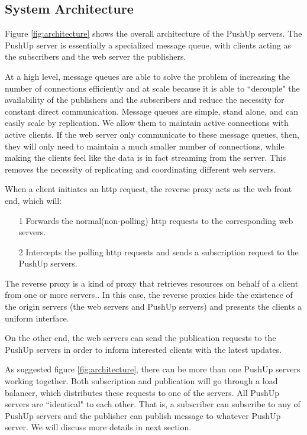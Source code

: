 \subsection{System Architecture\\}

Figure \ref{fig:architecture} shows the overall architecture of the PushUp servers.
The PushUp server is essentially a specialized message queue, with clients 
acting as the subscribers and the web server the publishers.

At a high level, message queues are able to solve the problem of increasing the number of
connections efficiently and at scale because it is able to ``decouple" the availability of
the publishers and the subscribers and reduce the necessity for constant direct communication. 
Message queues are simple, stand alone, and can easily scale by replication. 
We allow them to maintain active connections with active clients. If the web server 
only communicate to these message queues, then, they will only need to maintain a much 
smaller number of connections, while making the clients feel like the data is in fact 
streaming from the server. This removes the necessity of replicating and coordinating different 
web servers.

When a client initiates an http request, the reverse proxy acts as the web front end,
which will:
\begin{itemize}
    \item[1] Forwards the normal(non-polling) http requests to the corresponding 
             web servers.
    \item[2] Intercepts the polling http requests and sends a subscription request to 
             the PushUp servers.
\end{itemize}


The reverse proxy is a kind of proxy that retrieves
resources on behalf of a client from one or more 
servers.\cite{ReverseProxy}. In this case, the reverse
proxies hide the existence of the origin servers (the 
web servers and PushUp servers) and presents the clients
a uniform interface.

On the other end, the web servers can send the publication requests to the 
PushUp servers in order to inform interested clients with the latest updates.

As suggested figure \ref{fig:architecture}, there can be more than one PushUp 
servers working together. Both subscription and publication will go through a 
load balancer, which distributes these requests to one of the servers. All 
PushUp servers are ``identical" to each other. That is, a subscriber can 
subscribe to any of PushUp servers and the publisher can 
publish message to whatever PushUp server. We will discuss more details in next
section.

